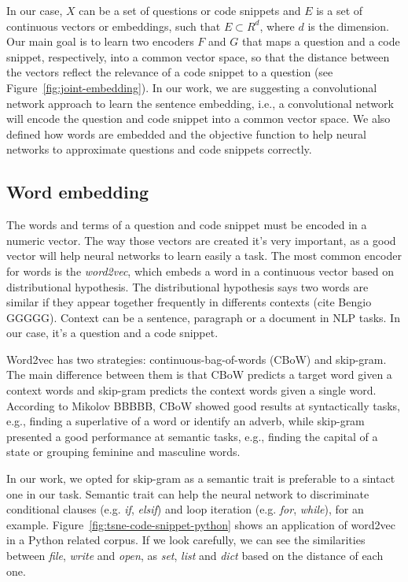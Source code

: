 \documentclass[sigconf]{acmart}
\begin{document}
In our case, $X$ can be a set of questions or code snippets and $E$ is a set of continuous vectors or embeddings, such that $E \subset R^{d}$, where $d$ is the dimension. Our main goal is to learn two encoders $F$ and $G$ that maps a question and a code snippet, respectively, into a common vector space, so that the distance between the vectors reflect the relevance of a code snippet to a question (see Figure~\ref{fig:joint-embedding}). In our work, we are suggesting a convolutional network approach to learn the sentence embedding, i.e., a convolutional network will encode the question and code snippet into a common vector space. We also defined how words are embedded and the objective function to help neural networks to approximate questions and code snippets correctly.

\subsection{Word embedding}

The words and terms of a question and code snippet must be encoded in a numeric vector. The way those vectors are created it's very important, as a good vector will help neural networks to learn easily a task. The most common encoder for words is the \emph{word2vec}, which embeds a word in a continuous vector based on distributional hypothesis. The distributional hypothesis says two words are similar if they appear together frequently in differents contexts (cite Bengio GGGGG). Context can be a sentence, paragraph or a document in NLP tasks. In our case, it's a question and a code snippet.

Word2vec has two strategies: continuous-bag-of-words (CBoW) and skip-gram. The main difference between them is that CBoW predicts a target word given a context words and skip-gram predicts the context words given a single word. According to Mikolov BBBBB, CBoW showed good results at syntactically tasks, e.g., finding a superlative of a word or identify an adverb, while skip-gram presented a good performance at semantic tasks, e.g., finding the capital of a state or grouping feminine and masculine words. 

In our work, we opted for skip-gram as a semantic trait is preferable to a sintact one in our task. Semantic trait can help the neural network to discriminate conditional clauses (e.g. \emph{if}, \emph{elsif}) and loop iteration (e.g. \emph{for}, \emph{while}), for an example. Figure~\ref{fig:tsne-code-snippet-python} shows an application of word2vec in a Python related corpus. If we look carefully, we can see the similarities between \emph{file}, \emph{write} and \emph{open}, as \emph{set}, \emph{list} and \emph{dict} based on the distance of each one.
\end{document}
